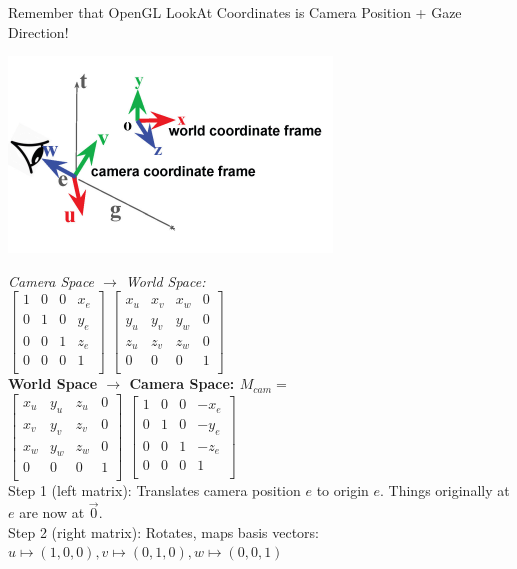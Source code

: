 \documentclass[letterpaper, 8pt]{extarticle}
\begin{document}
\begin{multicols*}{4}
Remember that OpenGL LookAt Coordinates is Camera Position + Gaze Direction!

\includegraphics[width=.5\linewidth]{camera-basis.png}

\textit{Camera Space $\to$ World Space:}\\
\(
\begin{bmatrix}
    1 & 0 & 0 & x_e \\
    0 & 1 & 0 & y_e \\
    0 & 0 & 1 & z_e \\
    0 & 0 & 0 & 1   \\
\end{bmatrix}
\)
\(
\begin{bmatrix}
    x_u & x_v & x_w & 0 \\
    y_u & y_v & y_w & 0 \\
    z_u & z_v & z_w & 0 \\
    0   & 0   & 0   & 1 \\
\end{bmatrix}
\)\\

\textbf{World Space $\to$ Camera Space: $M_{cam}=$}\\
\(
\begin{bmatrix}
    x_u & y_u & z_u & 0 \\
    x_v & y_v & z_v & 0 \\
    x_w & y_w & z_w & 0 \\
    0   & 0   & 0   & 1 \\
\end{bmatrix}
\)
\(
\begin{bmatrix}
    1 & 0 & 0 & -x_e \\
    0 & 1 & 0 & -y_e \\
    0 & 0 & 1 & -z_e \\
    0 & 0 & 0 & 1    \\
\end{bmatrix}
\)
\\
Step 1 (left matrix): Translates camera position $e$ to origin $e$. Things originally at $e$ are now at $\vec{0}$.\\
Step 2 (right matrix): Rotates, maps basis vectors: $u \mapsto (1,0,0), v \mapsto (0,1,0), w \mapsto (0,0,1)$


\end{multicols*}
\end{document}
